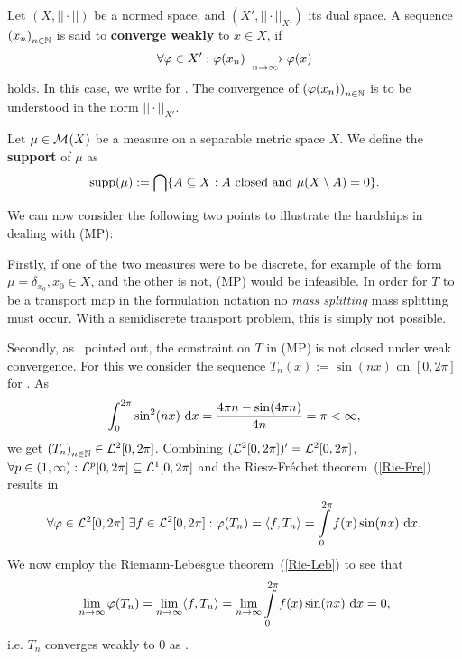 \begin{definition}\label{WeakCon}
	Let $(X, ||\cdot||)$ be a normed space, and $(X', ||\cdot||_{X'})$ its dual space. A sequence ${(x_n)}_{\NinN}$ is said to \textbf{converge weakly} to $x \in X$, if
	\[ \forall \varphi \in X': \varphi(x_n) \xrightarrow[\Ninf]{} \varphi(x) \]
	holds. In this case, we write  for \Ninf. The convergence of ${(\varphi(x_n))}_{\NinN}$ is to be understood in the norm $||\cdot||_{X'}$.
\end{definition}

\begin{definition}\label{Supp}
	Let $\mu \in \M{X}$ be a measure on a separable metric space $X$. We define the \textbf{support} of $\mu$ as
	\[ \supp{\mu} := \bigcap \{ A \subseteq X : A \text{ closed and } \mu(X \setminus A) = 0 \}. \]
\end{definition}

We can now consider the following two points to illustrate the hardships in dealing with (MP):

Firstly, if one of the two measures were to be discrete, for example of the form $\mu = \delta_{x_0}, x_0 \in X$, and the other is not, (MP) would be infeasible. In order for $T$ to be a transport map in the formulation notation no \textit{mass splitting} mass splitting must occur. With a semidiscrete transport problem, this is simply not possible.

Secondly, as~\cite{San2015} pointed out, the constraint on $T$ in (MP) is not closed under weak convergence. For this we consider the sequence $T_n(x) := \sin(nx)$ on $[0, 2 \pi]$ for \NinN. As
\[ \int_0^{2 \pi} \sin^2(nx)~\D[x] = \frac{4 \pi n - \sin(4\pi n)}{4n} = \pi < \infty, \]
we get ${(T_n)}_{\NinN} \in \ELL{2}[0, 2 \pi]$. Combining $(\ELL{2}[0, 2 \pi])' = \ELL{2}[0, 2 \pi]$, $\forall p \in (1, \infty) : \ELL{p}[0, 2\pi] \subseteq \ELL{1}[0, 2\pi]$ and the Riesz-Fr\'{e}chet theorem~(\ref{Rie-Fre}) results in
\[ \forall \varphi \in \ELL{2}[0, 2\pi]~\exists f \in \ELL{2}[0, 2\pi]: \varphi(T_n) = \inner{f}{T_n} = \int\limits_0^{2\pi} f(x) \sin(nx)~\D[x]. \]
We now employ the Riemann-Lebesgue theorem~(\ref{Rie-Leb}) to see that
\[ \lim\limits_{\Ninf} \varphi(T_n) = \lim\limits_{\Ninf} \inner{f}{T_n} = \lim\limits_{\Ninf} \int\limits_0^{2\pi} f(x) \sin(nx)~\D[x] = 0, \]
i.e. $T_n$ converges weakly to $0$ as \Ninf.


